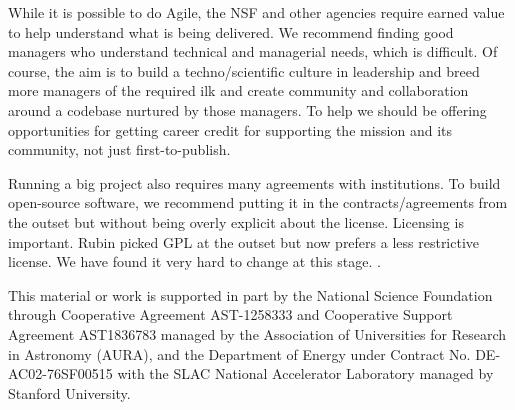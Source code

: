 \documentclass[11pt,twoside]{article}
\begin{document}
While it is possible to do Agile, the NSF and other agencies require earned value \citep{2014SPIE.9150E..1EG,2016SPIE.9911E..0NK} to help understand what is being delivered.
We recommend finding good managers who understand technical and managerial needs, which is difficult.
Of course, the aim is to build a techno/scientific culture in leadership and breed more managers of the required ilk and
create community and collaboration around a codebase nurtured by those managers.
To help
we should be offering opportunities for getting career credit for supporting the mission and its community, not just first-to-publish.

Running a big project also requires many agreements with institutions.
To build open-source software, we recommend putting it in the contracts/agreements from the outset but without being overly explicit about the license.
Licensing is important.
Rubin picked GPL at the outset but now prefers a less restrictive license.
We have found it very hard to change at this stage. .

\acknowledgments This material or work is supported in part by the National Science Foundation through Cooperative Agreement AST-1258333 and Cooperative Support Agreement AST1836783 managed by the Association of Universities for Research in Astronomy (AURA), and the Department of Energy under Contract No. DE-AC02-76SF00515 with the SLAC National Accelerator Laboratory managed by Stanford University.


\end{document}
